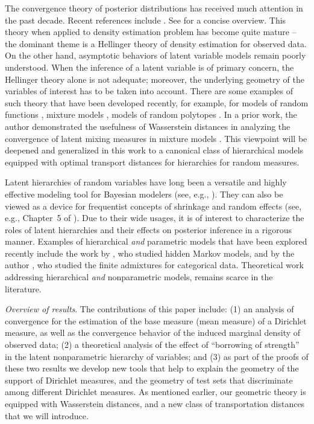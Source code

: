 \documentclass[MSNbibl,number,citesort]{arxbj}
\begin{document}
The convergence theory of posterior distributions has received much
attention in the past decade. Recent references include \cite
{Barron-Shervish-Wasserman-99,Ghosal-Ghosh-vanderVaart-00,Shen-Wasserman-01,Ghosh-Ramamoorthi-02,Walker-04,Walker-Lijoi-Prunster-07}.
See \cite{Ghosal-10} for a concise overview. This theory when applied
to density estimation problem
has become quite mature -- the dominant theme is
a Hellinger theory of density estimation for observed data.
On the other hand, asymptotic behaviors of latent variable models
remain poorly understood. When the inference
of a latent variable is of primary concern, the Hellinger theory alone
is not adequate; moreover, the underlying geometry of the variables of
interest has to be taken into account.
There are some examples of such theory that
have been developed recently, for example, for models of random
functions \cite{vanderVaart-vanZanten-08a,Gine-Nickl}, mixture
models \cite{Rousseau-Mengersen-11,Nguyen-11,Gassiat-vanHandel},
models of random polytopes \cite{Nguyen-admixture}.
In a prior work, the author demonstrated
the usefulness of Wasserstein distances in analyzing the convergence
of latent mixing measures in mixture models \cite{Nguyen-11}.
This viewpoint will be deepened and generalized in this work
to a canonical class of hierarchical models equipped with
optimal transport distances for hierarchies
for random measures.

Latent hierarchies of random variables
have long been a versatile and highly effective
modeling tool for Bayesian modelers (see, e.g., \cite{Berger}).
They can also be viewed as a device for
frequentist concepts of shrinkage and random effects
(see, e.g., Chapter~5 of \cite{Lehmann-Casella}).
Due to their wide usages, it is of interest to characterize
the roles of latent hierarchies and their effects on posterior
inference in
a rigorous manner. Examples of hierarchical \emph{and} parametric
models that have been explored recently include the work
by \cite{Gassiat-Rousseau}, who studied hidden Markov models,
and by the author \cite{Nguyen-admixture}, who studied the finite
admixtures for categorical data.
Theoretical work addressing hierarchical \emph{and} nonparametric
models, remains scarce in the literature.

\textit{Overview of results}.
The contributions of this paper
include: (1) an analysis of convergence for the estimation of
the base measure (mean measure) of a Dirichlet measure,
as well as the convergence behavior of the induced marginal
density of observed data;
(2) a theoretical analysis of the effect of
``borrowing of strength'' in the latent nonparametric hierarchy
of variables;
and (3) as part of the proofs of these two results
we develop new tools that help to explain
the geometry of the support of Dirichlet measures, and the geometry
of test sets that discriminate among different Dirichlet measures.
As mentioned
earlier, our geometric theory is equipped with Wasserstein distances,
and a new class of transportation distances that we will
introduce.
\end{document}
